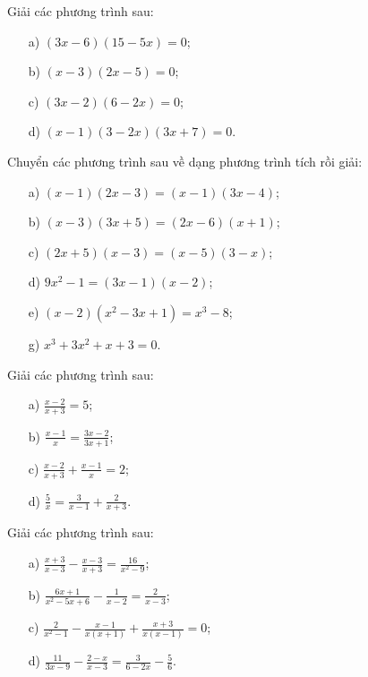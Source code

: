\documentclass[%
    fontsize=12pt,%
    chapterprefix=false,%
    open=right,%
    twoside=false,%
    numbers=noenddot,%
    headings=optiontohead,%
    final,%
    DIV=15,%
    parskip=half %
]{scrbook}
\begin{document}
\begin{tuluan}

\item Giải các phương trình sau:
\begin{enumerate}[label=\alph*)]
  \item[a)] $(3x - 6)(15 - 5x) = 0$;
  \item[b)] $(x - 3)(2x - 5) = 0$;
  \item[c)] $(3x - 2)(6 - 2x) = 0$;
  \item[d)] $(x - 1)(3 - 2x)(3x + 7) = 0$.
\end{enumerate}

\item Chuyển các phương trình sau về dạng phương trình tích rồi giải:
\begin{enumerate}[label=\alph*)]
  \item[a)] $(x - 1)(2x - 3) = (x - 1)(3x - 4)$;
  \item[b)] $(x - 3)(3x + 5) = (2x - 6)(x + 1)$;
  \item[c)] $(2x + 5)(x - 3) = (x - 5)(3 - x)$;
  \item[d)] $9x^2 - 1 = (3x - 1)(x - 2)$;
  \item[e)] $(x - 2)(x^2 - 3x + 1) = x^3 - 8$;
  \item[g)] $x^3 + 3x^2 + x + 3 = 0$.
\end{enumerate}

\item Giải các phương trình sau:
\begin{enumerate}[label=\alph*)]
  \item[a)] $\frac{x - 2}{x + 3} = 5$;
  \item[b)] $\frac{x - 1}{x} = \frac{3x - 2}{3x + 1}$;
  \item[c)] $\frac{x - 2}{x + 3} + \frac{x - 1}{x} = 2$;
  \item[d)] $\frac{5}{x} = \frac{3}{x - 1} + \frac{2}{x + 3}$.
\end{enumerate}

\item Giải các phương trình sau:
\begin{enumerate}[label=\alph*)]
  \item[a)] $\frac{x + 3}{x - 3} - \frac{x - 3}{x + 3} = \frac{16}{x^2 - 9}$;
  \item[b)] $\frac{6x + 1}{x^2 - 5x + 6} - \frac{1}{x - 2} = \frac{2}{x - 3}$;
  \item[c)] $\frac{2}{x^2 - 1} - \frac{x - 1}{x(x + 1)} + \frac{x + 3}{x(x - 1)} = 0$;
  \item[d)] $\frac{11}{3x - 9} - \frac{2 - x}{x - 3} = \frac{3}{6 - 2x} - \frac{5}{6}$.
\end{enumerate}


\end{tuluan}
\end{document}

